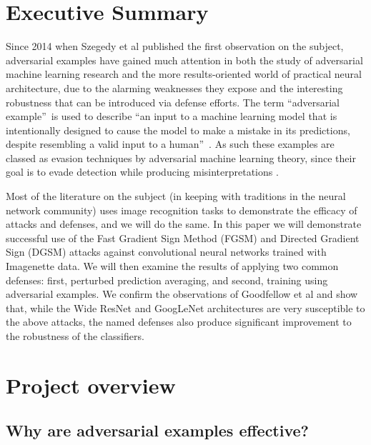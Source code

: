 \documentclass[conference]{IEEEtran}
\begin{document}
\tableofcontents%

\bigskip

\section{Executive Summary}

Since 2014 when Szegedy et al \cite{szegedy2014intriguing} published the
first observation on the subject, adversarial examples have gained much
attention in both the study of adversarial machine learning research and the
more results-oriented world of practical neural architecture, due to the
alarming weaknesses they expose and the interesting robustness that can be
introduced via defense efforts. The term \textquotedblleft adversarial
example\textquotedblright\ is used to describe \textquotedblleft an input to
a machine learning model that is intentionally designed to cause the model
to make a mistake in its predictions, despite resembling a valid input to a
human\textquotedblright\ \cite{wiyatno2019adversarial}. As such these
examples are classed as evasion techniques by adversarial machine learning
theory, since their goal is to evade detection while producing
misinterpretations \cite{wiki:aml}.

Most of the literature on the subject (in keeping with traditions in the
neural network community) uses image recognition tasks to demonstrate the
efficacy of attacks and defenses, and we will do the same. In this paper we
will demonstrate successful use of the Fast Gradient Sign Method (FGSM) \cite%
{goodfellow2014explaining} and Directed Gradient Sign (DGSM) \cite%
{madry2020adversarial} attacks against convolutional neural networks trained
with Imagenette data. We will then examine the results of applying two
common defenses: first, perturbed prediction averaging, and second, training
using adversarial examples. We confirm the observations of Goodfellow et al 
\cite{goodfellow2014explaining} and show that, while the Wide ResNet and
GoogLeNet architectures are very susceptible to the above attacks, the named
defenses also produce significant improvement to the robustness of the
classifiers.

\section{Project overview}

\subsection{Why are adversarial examples effective?}
\end{document}
